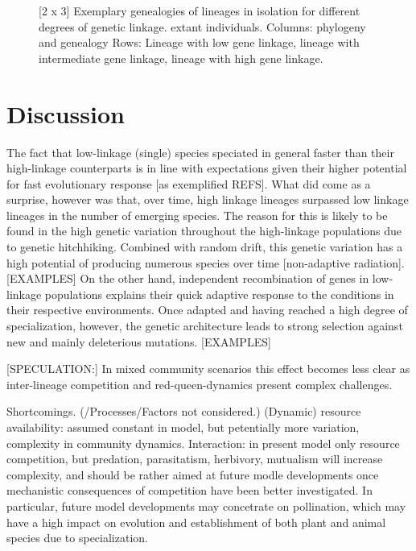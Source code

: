 \documentclass[a4paper]{scrartcl}
\begin{document}
\begin{figure}
  \caption{[2 x 3]
    Exemplary genealogies of lineages in isolation for different degrees of genetic linkage.
    extant individuals.
    Columns: phylogeny and genealogy
    Rows: Lineage with low gene linkage,
    lineage with intermediate gene linkage,
    lineage with high gene linkage.}
  \label{phylogenies}
\end{figure}

\section{Discussion}
The fact that low-linkage (single) species speciated in general faster than their high-linkage counterparts
is in line with expectations given their higher potential for fast evolutionary response [as exemplified REFS].
What did come as a surprise, however was that, over time, high linkage lineages surpassed low linkage lineages
in the number of emerging species.
The reason for this is likely to be found in the high genetic variation throughout the high-linkage populations
due to genetic hitchhiking.
Combined with random drift, this genetic variation has a high potential of producing numerous species over time [non-adaptive radiation].
[EXAMPLES]
On the other hand, independent recombination of genes in low-linkage populations explains their quick adaptive response
to the conditions in their respective environments.
Once adapted and having reached a high degree of specialization, however, the genetic architecture leads to strong selection against
new and mainly deleterious mutations.
[EXAMPLES]

[SPECULATION:] In mixed community scenarios this effect becomes less clear as inter-lineage competition and red-queen-dynamics
present complex challenges.



Shortcomings. (/Processes/Factors not considered.)
(Dynamic) resource availability: assumed constant in model, but petentially more variation, complexity in community dynamics.
Interaction: in present model only resource competition, %
but predation, parasitatism, herbivory, mutualism will increase complexity,
and should be rather aimed at future modle developments once mechanistic consequences of competition have been better investigated.
In particular, future model developments may concetrate on pollination,
which may have a high impact on evolution and establishment of both plant and animal species due to specialization. %
\end{document}
